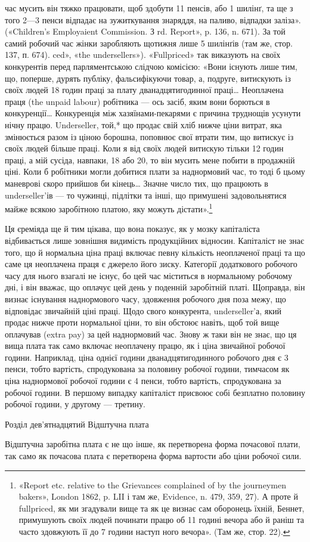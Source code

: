 час мусить він тяжко працювати, щоб здобути 11 пенсів, або 1 шилінґ,
та ще з того 2—3 пенси відпадає на зужиткування знаряддя, на паливо,
відпадки заліза». («Children’s Employaient Commission. З rd. Report», p.
136, n. 671). За той самий робочий час жінки заробляють щотижня
лише 5 шилінґів (там же, стор. 137, п. 674).
ced», «the undersellers»). «Fullpriced» так виказують на своїх
конкурентів перед парляментською слідчою комісією: «Вони
існують лише тим, що, поперше, дурять публіку, фальсифікуючи
товар, а, подруге, витискують із своїх людей 18 годин праці
за плату дванадцятигодинної праці\dots{} Неоплачена праця (the
unpaid labour) робітника — ось засіб, яким вони борються в
конкуренції\dots{} Конкуренція між хазяїнами-пекарями є причина
труднощів усунути нічну працю. Underseller, той,* що продає
свій хліб нижче ціни витрат, яка змінюється разом із ціною
борошна, поповнює свої втрати тим, що витискує із своїх людей
більше праці. Коли я від своїх людей витискую тільки 12 годин
праці, а мій сусіда, навпаки, 18 або 20, то він мусить мене побити
в продажній ціні. Коли б робітники могли добитися плати за
наднормовий час, то тоді б цьому маневрові скоро прийшов би
кінець\dots{} Значне число тих, що працюють в underseller’ів — то
чужинці, підлітки та інші, що примушені задовольнятися майже
всякою заробітною платою, яку можуть дістати».\footnote{
«Report etc. relative to the Grievances complained of by the
journeymen bakers», London 1862, p. LII і там же, Evidence, n. 479,
359, 27). А проте й fullpriced, як ми згадували вище та як це визнає сам
оборонець їхній, Беннет, примушують своїх людей починати працю об
11 годині вечора або й раніш та часто здовжують її до 7 години наступ
ного вечора». (Там же, стор. 22).
}

Ця єреміяда ще й тим цікава, що вона показує, як у мозку
капіталіста відбивається лише зовнішня видимість продукційних
відносин. Капіталіст не знає того, що й нормальна ціна праці
включає певну кількість неоплаченої праці та що саме ця неоплачена
праця є джерело його зиску. Категорії додаткового робочого
часу для нього взагалі не існує, бо цей час міститься в нормальному
робочому дні, і він вважає, що оплачує цей день у поденній
заробітній платі. Щоправда, він визнає існування наднормового
часу, здовження робочого дня поза межу, що відповідає звичайній
ціні праці. Щодо свого конкурента, underseller’а, який продає
нижче проти нормальної ціни, то він обстоює навіть, щоб той
вище оплачував (extra pay) за цей наднормовий час. Знову ж
таки він не знає, що ця вища плата так само включає неоплачену
працю, як і ціна звичайної робочої години. Наприклад,
ціна однієї години дванадцятигодинного робочого дня є 3 пенси,
тобто вартість, спродукована за половину робочої години, тимчасом
як ціна наднормової робочої години є 4 пенси, тобто вартість,
спродукована за  робочої години. В першому випадку капіталіст
присвоює собі безплатно половину робочої години, у
другому — третину.

Розділ дев’ятнадцятий
Відштучна плата

Відштучна заробітна плата є не що інше, як перетворена
форма почасової плати, так само як почасова плата є перетворена
форма вартости або ціни робочої сили.
